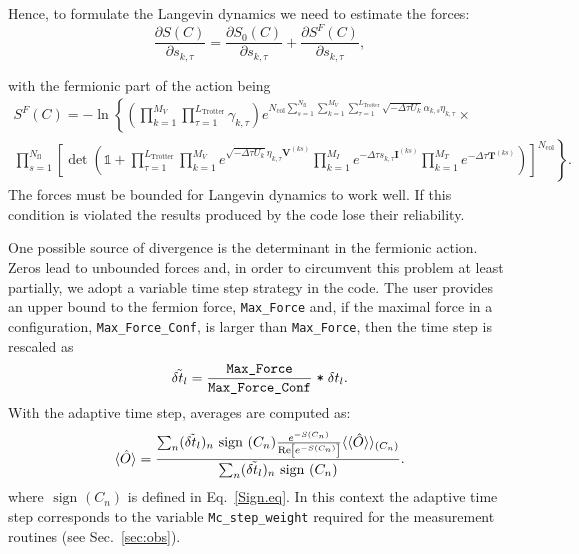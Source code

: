 Hence, to  formulate  the Langevin dynamics  we need  to estimate the forces:
\begin{equation}
	\frac { \partial S (C)}{\partial s_{k,\tau} } =\frac { \partial S_{0}(C)}{\partial s_{k,\tau} } +  \frac { \partial S^F(C)}{\partial s_{k,\tau} },
\end{equation}

with the fermionic part of the action being
\begin{multline}
S^F(C) =   - \ln \left\{  \left( \prod_{k=1}^{M_V} \prod_{\tau=1}^{L_{\mathrm{Trotter}}} \gamma_{k,\tau} \right)
    e^{ N_{\mathrm{col}}\sum\limits_{s=1}^{N_{\mathrm{fl}}} \sum\limits_{k=1}^{M_V} \sum\limits_{\tau = 1}^{L_{\mathrm{Trotter}}}\sqrt{-\Delta \tau U_k}  \alpha_{k,s} \eta_{k,\tau} } 
  \right. \times \\
    \left.
	\prod_{s=1}^{N_{\mathrm{fl}}}\left[\det\left(  \mathds{1} + 
	\prod_{\tau=1}^{L_{\mathrm{Trotter}}}   
	\prod_{k=1}^{M_V}   e^{  \sqrt{ -\Delta \tau  U_k} \eta_{k,\tau} {\bm V}^{(ks)} }   \prod_{k=1}^{M_I}   e^{  -\Delta \tau s_{k,\tau}  {\bm I}^{(ks)}}  
	\prod_{k=1}^{M_T}   e^{-\Delta \tau {\bm T}^{(ks)}} 
	\right) \right]^{N_{\mathrm{col}}} \right\}  .
\end{multline}
The forces must be bounded for Langevin dynamics to work well. If this condition is violated the results produced by the code lose their reliability. 

One possible source of divergence is the determinant in the fermionic action. Zeros lead to unbounded forces and, in order to circumvent this problem at least partially, we adopt a variable time step strategy in the code.  The user   provides an upper bound to the fermion force, \texttt{Max\_Force} and, if the maximal force in a configuration, \texttt{Max\_Force\_Conf}, is larger than \texttt{Max\_Force}, then the time step is rescaled as 
\begin{equation}
     \tilde{\delta t_{l}}   =  \frac{ \texttt{Max\_Force}} {\texttt{Max\_Force\_Conf}} \; \texttt{*} \; \delta t_{l}.
\end{equation}
With the adaptive time  step,  averages are computed as: 
\begin{equation}
   \langle \hat{O} \rangle = \frac{ \sum_n (  \tilde{\delta t_{l}}  )_n  \text{ sign }(C_n)   \frac{e^{-S(C_n)}}{\operatorname{Re} \left[e^{-S(C_n)} \right]}   \langle \langle \hat{O} \rangle   \rangle_{(C_n)} } {\sum_n (  \tilde{\delta t_{l}}  )_n   \text{ sign }(C_n)  }. 
\end{equation}
where  $\text{ sign }(C_n)$   is defined in Eq.~\ref{Sign.eq}.    In this context the adaptive time step corresponds to the variable \texttt{Mc\_step\_weight}  required for the measurement routines (see Sec.~\ref{sec:obs}).  {\color{red}{FFA. We will have to update this section}}

